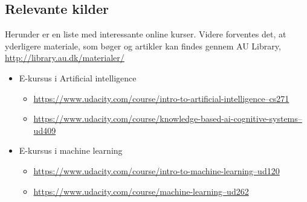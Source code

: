 \subsection*{Relevante kilder}
Herunder er en liste med interessante online kurser. Videre forventes det, at yderligere materiale, som bøger og artikler kan findes gennem AU Library, \href{http://library.au.dk/materialer/}{http://library.au.dk/materialer/}
\begin{itemize}
	\item E-kursus i Artificial intelligence
		\begin{itemize}
			\item \href{https://www.udacity.com/course/intro-to-artificial-intelligence--cs271}{https://www.udacity.com/course/intro-to-artificial-intelligence--cs271}
			\item \href{https://www.udacity.com/course/knowledge-based-ai-cognitive-systems--ud409}{https://www.udacity.com/course/knowledge-based-ai-cognitive-systems--ud409}
		\end{itemize}
	\item E-kursus i machine learning
		\begin{itemize}
			\item \href{https://www.udacity.com/course/intro-to-machine-learning--ud120}{https://www.udacity.com/course/intro-to-machine-learning--ud120}
			\item \href{https://www.udacity.com/course/machine-learning--ud262}{https://www.udacity.com/course/machine-learning--ud262}
		\end{itemize}

\end{itemize}


